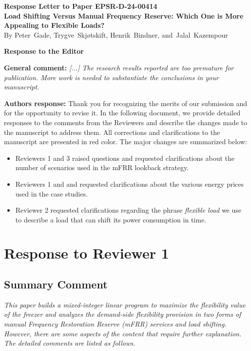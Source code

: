 \documentclass[10pt]{article}
\newcommand{\nt}[1]{\textcolor{newtextcolor}{#1}}
\newcommand{\auth}{\textbf{Authors response: }}
\begin{document}
\begin{center}
  \Large{\textbf{Response Letter to Paper EPSR-D-24-00414 \\ Load Shifting Versus Manual Frequency Reserve: Which One is More Appealing to Flexible Loads?}} \\
  \vspace{0.2cm}
  \small{By Peter~Gade,
    Trygve~Skjøtskift,
    Henrik~Bindner,
    and~Jalal~Kazempour} \\
\end{center}

\begingroup
\allowdisplaybreaks


\textbf{\large{Response to the Editor}}


\textbf{General comment:} \textit{[...] The research results reported are too premature for publication. More work is needed to substantiate the conclusions in your manuscript.}

\auth Thank you for recognizing the merits of our submission and for the opportunity to revise it. In the following document, we provide detailed responses to the comments from the Reviewers and describe the changes made to the manuscript to address them. All corrections and clarifications to the manuscript are presented in \nt{red} color. The major changes are summarized below:

\begin{itemize}
  \item Reviewers 1 and 3 raised questions and requested clarifications about the number of scenarios used in the mFRR lookback strategy.

  \item Reviewers 1 and and requested clarifications about the various energy prices used in the case studies.

  \item Reviewer 2 requested clarifications regarding the phrase \textit{flexible load} we use to describe a load that can shift its power consumption in time.
\end{itemize}


\newpage
\section{Response to Reviewer 1}

\subsection{Summary Comment} \textit{This paper builds a mixed-integer linear program to maximize the flexibility value of the freezer and analyzes the demand-side flexibility provision in two forms of manual Frequency Restoration Reserve (mFRR) services and load shifting. However, there are some aspects of the content that require further explanation. The detailed comments are listed as follows.}
\end{document}
